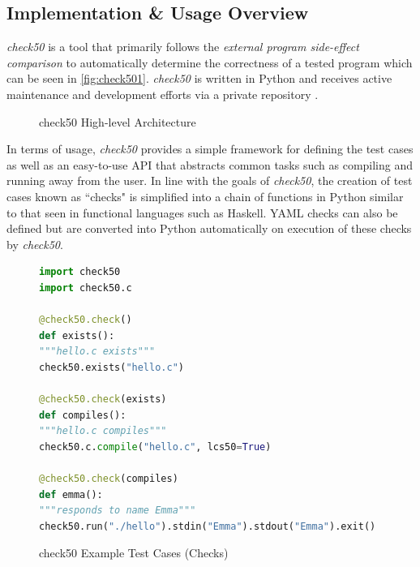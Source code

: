 \documentclass[hidelinks, 12pt]{extreport}
\begin{document}
\subsection{Implementation \& Usage Overview}

\textit{check50} is a tool that primarily follows the \textit{external program side-effect comparison} to automatically determine the correctness of a tested program which can be seen in \autoref{fig:check501}. \textit{check50} is written in Python and receives active maintenance and development efforts via a private repository \cite{check50Github}.

\begin{figure}[h]
	\centering
	\caption{check50 High-level Architecture}
	\label{fig:check501}
\end{figure}

In terms of usage, \textit{check50} provides a simple framework for defining the test cases as well as an easy-to-use API that abstracts common tasks such as compiling and running away from the user. In line with the goals of \textit{check50}, the creation of test cases known as ``checks" is simplified into a chain of functions in Python similar to that seen in functional languages such as Haskell. YAML checks can also be defined but are converted into Python automatically on execution of these checks by \textit{check50}.

\begin{figure}[h]
	\centering
	\begin{lstlisting}[language=python, breaklines=true, linewidth=\linewidth]
import check50
import check50.c

@check50.check()
def exists():
"""hello.c exists"""
check50.exists("hello.c")

@check50.check(exists)
def compiles():
"""hello.c compiles"""
check50.c.compile("hello.c", lcs50=True)

@check50.check(compiles)
def emma():
"""responds to name Emma"""
check50.run("./hello").stdin("Emma").stdout("Emma").exit()
	\end{lstlisting}
	\caption{check50 Example Test Cases (Checks)}
	\label{fig:check502}
\end{figure}
\end{document}
